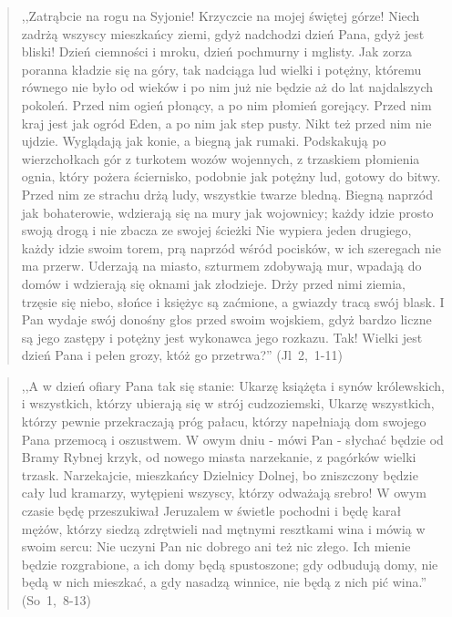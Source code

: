 \documentclass[10pt,a4paper,oneside]{article}
\begin{document}
\begin{quote}
,,Zatrąbcie na rogu na Syjonie! Krzyczcie na mojej świętej górze! Niech zadrżą wszyscy mieszkańcy ziemi, gdyż nadchodzi dzień Pana, gdyż jest bliski! Dzień ciemności i mroku, dzień pochmurny i mglisty. Jak zorza poranna kładzie się na góry, tak nadciąga lud wielki i potężny, któremu równego nie było od wieków i po nim już nie będzie aż do lat najdalszych pokoleń. Przed nim ogień płonący, a po nim płomień gorejący. Przed nim kraj jest jak ogród Eden, a po nim jak step pusty. Nikt też przed nim nie ujdzie. Wyglądają jak konie, a biegną jak rumaki. Podskakują po wierzchołkach gór z turkotem wozów wojennych, z trzaskiem płomienia ognia, który pożera ściernisko, podobnie jak potężny lud, gotowy do bitwy. Przed nim ze strachu drżą ludy, wszystkie twarze bledną. Biegną naprzód jak bohaterowie, wdzierają się na mury jak wojownicy; każdy idzie prosto swoją drogą i nie zbacza ze swojej ścieżki Nie wypiera jeden drugiego, każdy idzie swoim torem, prą naprzód wśród pocisków, w ich szeregach nie ma przerw. Uderzają na miasto, szturmem zdobywają mur, wpadają do domów i wdzierają się oknami jak złodzieje. Drży przed nimi ziemia, trzęsie się niebo, słońce i księżyc są zaćmione, a gwiazdy tracą swój blask. I Pan wydaje swój donośny głos przed swoim wojskiem, gdyż bardzo liczne są jego zastępy i potężny jest wykonawca jego rozkazu. Tak! Wielki jest dzień Pana i pełen grozy, któż go przetrwa?'' (Jl~2,~1-11)
\end{quote}
\begin{quote}
,,A w dzień ofiary Pana tak się stanie: Ukarzę książęta i synów królewskich, i wszystkich, którzy ubierają się w strój cudzoziemski, Ukarzę wszystkich, którzy pewnie przekraczają próg pałacu, którzy napełniają dom swojego Pana przemocą i oszustwem. W owym dniu - mówi Pan - słychać będzie od Bramy Rybnej krzyk, od nowego miasta narzekanie, z pagórków wielki trzask. Narzekajcie, mieszkańcy Dzielnicy Dolnej, bo zniszczony będzie cały lud kramarzy, wytępieni wszyscy, którzy odważają srebro! W owym czasie będę przeszukiwał Jeruzalem w świetle pochodni i będę karał mężów, którzy siedzą zdrętwieli nad mętnymi resztkami wina i mówią w swoim sercu: Nie uczyni Pan nic dobrego ani też nic złego. Ich mienie będzie rozgrabione, a ich domy będą spustoszone; gdy odbudują domy, nie będą w nich mieszkać, a gdy nasadzą winnice, nie będą z nich pić wina.'' (So~1,~8-13)
\end{quote}
\end{document}
